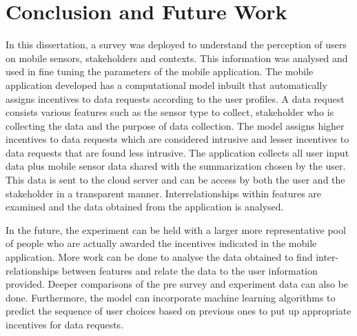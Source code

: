 \chapter{Conclusion and Future Work}

In this dissertation, a survey was deployed to understand the perception of users on mobile sensors, stakeholders and contexts. This information was analysed and used in fine tuning the parameters of the mobile application. The mobile application developed has a computational model inbuilt that automatically assigns incentives to data requests according to the user profiles. A data request consists various features such as the sensor type to collect, stakeholder who is collecting the data and the purpose of data collection. The model assigns higher incentives to data requests which are considered intrusive and lesser incentives to data requests that are found less intrusive. The application collects all user input data plus mobile sensor data shared with the summarization chosen by the user. This data is sent to the cloud server and can be access by both the user and the stakeholder in a transparent manner. Interrelationships within features are examined and the data obtained from the application is analysed.

In the future, the experiment can be held with a larger more representative pool of people who are actually awarded the incentives indicated in the mobile application. More work can be done to analyse the data obtained to find inter-relationships between features and relate the data to the user information provided. Deeper comparisons of the pre survey and experiment data can also be done. Furthermore, the model can incorporate machine learning algorithms to predict the sequence of user choices based on previous ones to put up appropriate incentives for data requests.
